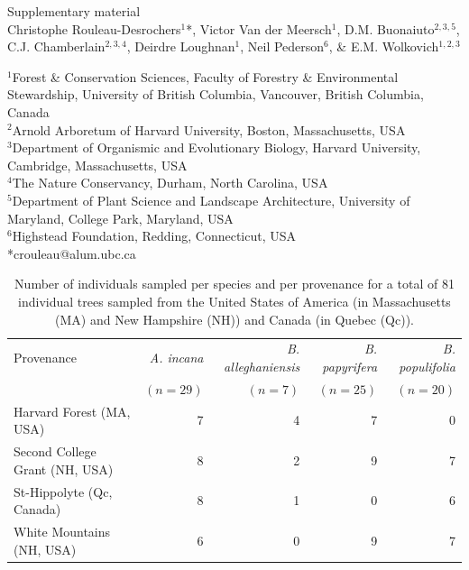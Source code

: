 \documentclass{article}\usepackage[]{graphicx}\usepackage[]{xcolor}
\begin{document}
\linenumbers
{}

\begin{center}
{\sc} {\Large Supplementary material} \\
\vspace{5ex}
{\sc} Christophe Rouleau-Desrochers$^1$*, Victor Van der Meersch$^1$, D.M. Buonaiuto$^{2,3,5}$, C.J. Chamberlain$^{2,3,4}$, Deirdre Loughnan$^1$, Neil Pederson$^6$, \& E.M. Wolkovich$^{1,2,3}$
\end{center}
$^1$Forest \& Conservation Sciences, Faculty of Forestry \& Environmental Stewardship, University of British Columbia, Vancouver, British Columbia, Canada\\
$^2$Arnold Arboretum of Harvard University, Boston, Massachusetts, USA\\
$^3$Department of Organismic and Evolutionary Biology, Harvard University, Cambridge, Massachusetts, USA\\
$^4$The Nature Conservancy, Durham, North Carolina, USA\\
$^5$Department of Plant Science and Landscape Architecture, University of Maryland, College Park, Maryland, USA \\
$^6$Highstead Foundation, Redding, Connecticut, USA \\
*crouleau@alum.ubc.ca

\newcommand{\Ainc}{\textit{A. incana}}
\newcommand{\Ball}{\textit{B. alleghaniensis}}
\newcommand{\Bpap}{\textit{B. papyrifera}}
\newcommand{\Bpop}{\textit{B. populifolia}}



\setcounter{table}{0}
\renewcommand{\thetable}{S\arabic{table}}
\setcounter{figure}{0}
\renewcommand{\thefigure}{S\arabic{figure}}

\setlength{\tabcolsep}{3pt}
\begin{table}[ht]
\centering
\caption{Number of individuals sampled per species and per provenance for a total of 81 individual trees sampled from the United States of America (in Massachusetts (MA) and New Hampshire (NH)) and Canada (in Quebec (Qc)).} 
\label{tab:tab_species}
\begin{tabular}{lrrrr}
  \hline
Provenance & \textit{A. incana} & \textit{B. alleghaniensis} & \textit{B. papyrifera} & \textit{B. populifolia} \\
 & $(n = 29)$ & $(n = 7)$ & $(n = 25)$ & $(n = 20)$ \\
\hline
 \hline
  \hline
Harvard Forest (MA, USA) & 7 & 4 & 7 & 0 \\ 
  Second College Grant (NH, USA) & 8 & 2 & 9 & 7 \\ 
  St-Hippolyte (Qc, Canada) & 8 & 1 & 0 & 6 \\ 
  White Mountains (NH, USA) & 6 & 0 & 9 & 7 \\ 
   \hline
\end{tabular}
\end{table}
\end{document}
